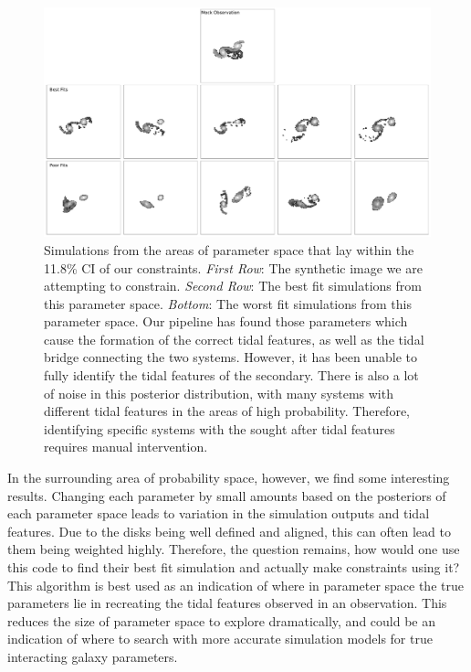 \begin{figure}
    \centering
    \includegraphics[width=\textwidth]{Chapter1/figures/best-fits-comb.pdf}
    \caption{Simulations from the areas of parameter space that lay within the 11.8\% CI of our constraints. \textit{First Row}: The synthetic image we are attempting to constrain. \textit{Second Row}: The best fit simulations from this parameter space. \textit{Bottom}: The worst fit simulations from this parameter space. Our pipeline has found those parameters which cause the formation of the correct tidal features, as well as the tidal bridge connecting the two systems. However, it has been unable to fully identify the tidal features of the secondary. There is also a lot of noise in this posterior distribution, with many systems with different tidal features in the areas of high probability. Therefore, identifying specific systems with the sought after tidal features requires manual intervention.}
    \label{fig:arp240_corner_plot}
\end{figure}

In the surrounding area of probability space, however, we find some interesting results. Changing each parameter by small amounts based on the posteriors of each parameter space leads to variation in the simulation outputs and tidal features. Due to the disks being well defined and aligned, this can often lead to them being weighted highly. Therefore, the question remains, how would one use this code to find their best fit simulation and actually make constraints using it? This algorithm is best used as an indication of where in parameter space the true parameters lie in recreating the tidal features observed in an observation. This reduces the size of parameter space to explore dramatically, and could be an indication of where to search with more accurate simulation models for true interacting galaxy parameters.

